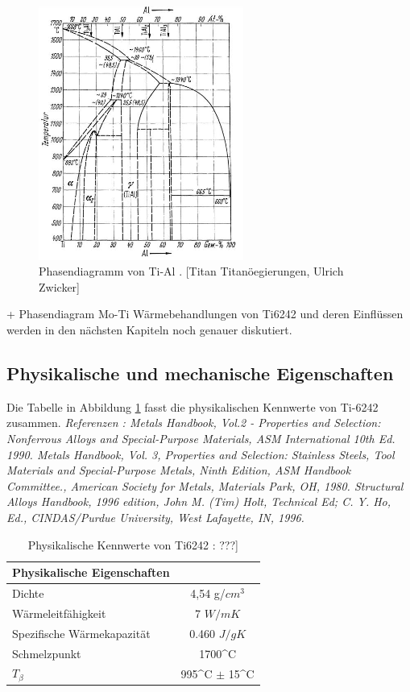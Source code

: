 \begin{figure}[H]
	\centering
	\includegraphics[width=0.6\textwidth]{Bilder/TiAl}
	\caption{Phasendiagramm von Ti-Al . [Titan Titanöegierungen, Ulrich Zwicker]}
\end{figure}
+ Phasendiagram Mo-Ti
Wärmebehandlungen von Ti6242 und deren Einflüssen werden in den nächsten Kapiteln noch genauer diskutiert.


\subsection{ Physikalische und mechanische Eigenschaften }

Die Tabelle in Abbildung \ref{Phy.eig.} fasst die physikalischen Kennwerte von Ti-6242 zusammen.
\newline
\textit{	Referenzen : 
	Metals Handbook, Vol.2 - Properties and Selection: Nonferrous Alloys and Special-Purpose Materials, ASM International 10th Ed. 1990.				
	Metals Handbook, Vol. 3, Properties and Selection: Stainless Steels, Tool Materials and Special-Purpose Metals, Ninth Edition, ASM Handbook Committee., American Society for Metals, Materials Park, OH, 1980.				
	Structural Alloys Handbook, 1996 edition, John M. (Tim) Holt, Technical Ed; C. Y. Ho, Ed., CINDAS/Purdue University, West Lafayette, IN, 1996. }

\begin{table}[H]
	\centering	
	\begin{tabular}{l c}
		
		Physikalische Eigenschaften & \\
		\hline
		Dichte& 4,54 g/$cm^3$\\
		Wärmeleitfähigkeit & 7 $W/mK$ \\
		Spezifische Wärmekapazität & 0.460 $J/gK$\\
		Schmelzpunkt & 1700^\circ C \\
		$T_{\beta}$ &  995^\circ C $\pm$ 15^\circ C \\
		\hline
		
	\end{tabular}
	\caption{Physikalische Kennwerte von Ti6242 : ???]}
	\label{Phy.eig.}
\end{table}


